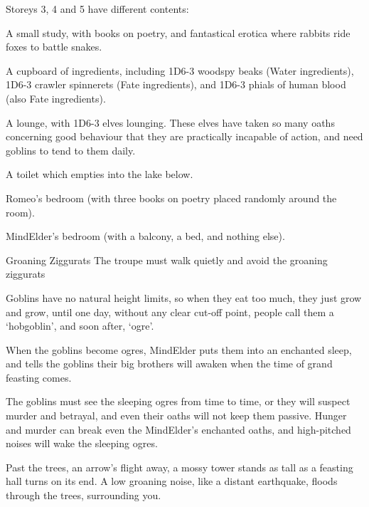 Storeys 3, 4 and 5 have different contents:

\begin{dlist}
  \item
  A small study, with books on poetry, and fantastical erotica where rabbits ride foxes to battle snakes.
  \item
  A cupboard of \glspl{ingredient}, including 1D6-3 woodspy beaks (Water \glspl{ingredient}), 1D6-3 \gls{crawler} spinnerets (Fate \glspl{ingredient}), and 1D6-3 phials of human blood (also Fate \glspl{ingredient}).
  \item
  A lounge, with 1D6-3 elves lounging.  These elves have taken so many oaths concerning good behaviour that they are practically incapable of action, and need goblins to tend to them daily.
  \item
  A toilet which empties into the lake below.
  \item
  Romeo's bedroom (with three books on poetry placed randomly around the room).
  \item
  \gls{MindElder}'s bedroom (with a balcony, a bed, and nothing else).
\end{dlist}


{Groaning Ziggurats}%
{The troupe must walk quietly and avoid the groaning ziggurats}%

Goblins have no natural height limits, so when they eat too much, they just grow and grow, until one day, without any clear cut-off point, people call them a `hobgoblin', and soon after, `\gls{ogre}'.

When the goblins become \glspl{ogre}, \gls{MindElder} puts them into an enchanted sleep, and tells the goblins their big brothers will awaken when the time of grand feasting comes.

The goblins must see the sleeping \glspl{ogre} from time to time, or they will suspect murder and betrayal, and even their oaths will not keep them passive.
Hunger and murder can break even the \gls{MindElder}'s enchanted oaths, and high-pitched noises will wake the sleeping \glspl{ogre}.

\begin{boxtext}
  Past the trees, an arrow's flight away, a mossy tower stands as tall as a feasting hall turns on its end.
  A low groaning noise, like a distant earthquake, floods through the trees, surrounding you.
\end{boxtext}

